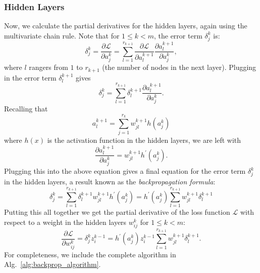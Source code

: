 \documentclass[../main.tex]{subfiles}
\begin{document}
\subsubsection{Hidden Layers}
Now, we calculate the partial derivatives for the hidden layers, again using
the multivariate chain rule.
%
Note that for $1 \leq k < m$, the error term $\delta_{j}^{k}$ is:
%
\begin{equation}
  \delta_{j}^{k} 
  = \frac{\partial\mathcal{L}}{\partial a_{j}^{k}} 
  = \sum_{l=1}^{r_{k+1}} \frac{\partial\mathcal{L}}{\partial
    a_{l}^{k+1}}\frac{\partial a_{l}^{k+1}}{\partial a_{j}^{k}},
\end{equation}
%
where $l$ rangers from $1$ to $r_{k+1}$ (the number of nodes in the next
layer).
%
Plugging in the error term $\delta_{l}^{k+1}$ gives
%
\begin{equation}
  \delta_{j}^{k} = \sum_{l=1}^{r_{k+1}} \delta_{l}^{k+1} \frac{\partial
    a_{l}^{k+1}}{\partial a_{j}^{k}}.
\end{equation}
%
Recalling that
%
\begin{equation}
  a_{l}^{k+1} = \sum_{j=1}^{r_{k}} w_{jl}^{k+1} h(a_{j}^{k})
\end{equation}
%
where $h(x)$ is the activation function in the hidden layers, we are left with
%
\begin{equation}
  \frac{\partial a_{l}^{k+1}}{\partial a_{j}^{k}} = w_{jl}^{k+1}
    h^{\prime}(a_{j}^{k}).
\end{equation}
%
Plugging this into the above equation gives a final equation for the error term
$\delta_{j}^{k}$ in the hidden layers, a result known as the
\emph{backpropagation formula}:
%
\begin{equation}
  \delta_{j}^{k} 
  = \sum_{l=1}^{r_{k+1}} \delta_{l}^{k+1} w_{jl}^{k+1}
      h^{\prime}(a_{j}^{k}) 
  = h^{\prime}(a_{j}^{k})\sum_{l=1}^{r_{k+1}} w_{jl}^{k+1} \delta_{l}^{k+1}
\label{eq:hidden_layers}
\end{equation}
%
Putting this all together we get the partial derivative of the loss function
$\mathcal{L}$ with respect to a weight in the hidden layers $w_{ij}^{k}$ for $1
\leq k < m$:
%
\begin{equation}
  \frac{\partial \mathcal{L}}{\partial w_{ij}^{k}} = \delta_{j}^{k} z_{i}^{k-1}
  = h^{\prime}(a_{j}^{k})z_{i}^{k-1}
    \sum_{l=1}^{r_{k+1}} w_{jl}^{k+1}\delta_{l}^{k+1}.
\label{eq:loss_terms}
\end{equation}
%
For completeness, we include the complete algorithm in
Alg.~\ref{alg:backprop_algorithm}.
\end{document}
